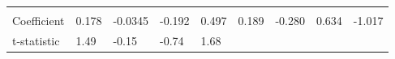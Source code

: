 \documentclass[
]{book}
\begin{document}
\begin{longtable}[]{@{}lllllllll@{}}
\begin{minipage}[t]{0.07\columnwidth}
\strut
\end{minipage} & \begin{minipage}[t]{0.07\columnwidth}\raggedright
\strut
\end{minipage} & \begin{minipage}[t]{0.10\columnwidth}\raggedright
\strut
\end{minipage}\tabularnewline
\begin{minipage}[t]{0.10\columnwidth}\raggedright
Coefficient\strut
\end{minipage} & \begin{minipage}[t]{0.08\columnwidth}\raggedright
0.178\strut
\end{minipage} & \begin{minipage}[t]{0.09\columnwidth}\raggedright
-0.0345\strut
\end{minipage} & \begin{minipage}[t]{0.07\columnwidth}\raggedright
-0.192\strut
\end{minipage} & \begin{minipage}[t]{0.06\columnwidth}\raggedright
0.497\strut
\end{minipage} & \begin{minipage}[t]{0.11\columnwidth}\raggedright
0.189\strut
\end{minipage} & \begin{minipage}[t]{0.07\columnwidth}\raggedright
-0.280\strut
\end{minipage} & \begin{minipage}[t]{0.07\columnwidth}\raggedright
0.634\strut
\end{minipage} & \begin{minipage}[t]{0.10\columnwidth}\raggedright
-1.017\strut
\end{minipage}\tabularnewline
\begin{minipage}[t]{0.10\columnwidth}\raggedright
t-statistic\strut
\end{minipage} & \begin{minipage}[t]{0.08\columnwidth}\raggedright
1.49\strut
\end{minipage} & \begin{minipage}[t]{0.09\columnwidth}\raggedright
-0.15\strut
\end{minipage} & \begin{minipage}[t]{0.07\columnwidth}\raggedright
-0.74\strut
\end{minipage} & \begin{minipage}[t]{0.06\columnwidth}\raggedright
1.68\strut
\end{minipage} & \begin{minipage}[t]{0.11\columnwidth}\raggedright

\end{minipage}
\end{longtable}
\end{document}
